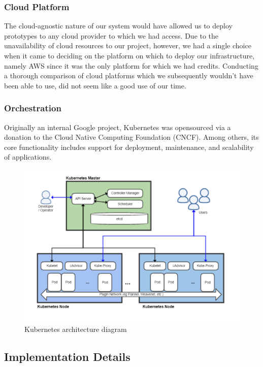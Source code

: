 \subsubsection{Cloud Platform}\label{cloud-platform}

The cloud-agnostic nature of our system would have allowed us to deploy
prototypes to any cloud provider to which we had access. Due to the
unavailability of cloud resources to our project, however, we had a
single choice when it came to deciding on the platform on which to
deploy our infrastructure, namely AWS since it was the only platform for
which we had credits. Conducting a thorough comparison of cloud
platforms which we subsequently wouldn't have been able to use, did not
seem like a good use of our time.

\subsubsection{Orchestration}\label{orchestration}

Originally an internal Google project, Kubernetes was opensourced via a
donation to the Cloud Native Computing Foundation (CNCF). Among others,
its core functionality includes support for deployment, maintenance, and
scalability of applications.

\begin{figure}[htbp]
  \centering
  \includegraphics[scale=0.45]{images/Kubernetes.png}
  \caption{Kubernetes architecture diagram \cite{WikiCommons:KubernetesArchitecture}}
\end{figure}


\subsection{Implementation Details}\label{implementation-details}


